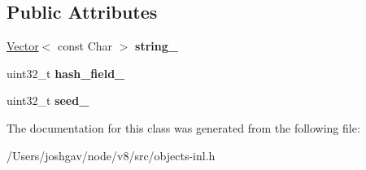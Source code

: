 \subsection*{Public Attributes}
\begin{DoxyCompactItemize}
\item 
\hyperlink{classv8_1_1internal_1_1_vector}{Vector}$<$ const Char $>$ {\bfseries string\+\_\+}\hypertarget{classv8_1_1internal_1_1_sequential_string_key_ad2ffeb3bb3a97b6b34cc541ca6cc4c60}{}\label{classv8_1_1internal_1_1_sequential_string_key_ad2ffeb3bb3a97b6b34cc541ca6cc4c60}

\item 
uint32\+\_\+t {\bfseries hash\+\_\+field\+\_\+}\hypertarget{classv8_1_1internal_1_1_sequential_string_key_a1654ac03f31e5d1a6615f85fb319ad43}{}\label{classv8_1_1internal_1_1_sequential_string_key_a1654ac03f31e5d1a6615f85fb319ad43}

\item 
uint32\+\_\+t {\bfseries seed\+\_\+}\hypertarget{classv8_1_1internal_1_1_sequential_string_key_ad572724f69e1b6d99287969da2cc8ef2}{}\label{classv8_1_1internal_1_1_sequential_string_key_ad572724f69e1b6d99287969da2cc8ef2}

\end{DoxyCompactItemize}


The documentation for this class was generated from the following file\+:\begin{DoxyCompactItemize}
\item 
/\+Users/joshgav/node/v8/src/objects-\/inl.\+h\end{DoxyCompactItemize}

